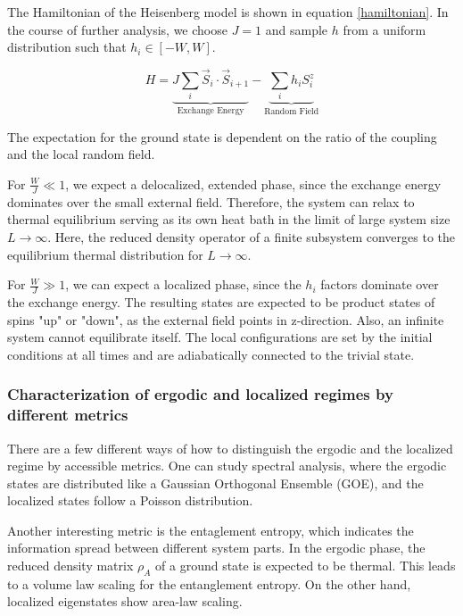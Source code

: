 \documentclass[reprint,amsmath,amssymb,aps,prb]{revtex4-2}
\begin{document}
The Hamiltonian of the Heisenberg model is shown in equation \ref{hamiltonian}. In the course of further analysis, we choose $J=1$ and sample $h$ from a uniform distribution such that $h_i \in \left[-W, W\right]$.

\begin{equation}
	H=\underbrace{J\sum_i \vec{S}_i\cdot\vec{S}_{i+1}}_{\text{Exchange Energy}}-\underbrace{\sum_ih_iS_i^z}_{\text{Random Field}}\label{hamiltonian}
\end{equation}

The expectation for the ground state is dependent on the ratio of the coupling and the local random field. 

For $\frac{W}{J} \ll 1$, we expect a delocalized, extended phase, since the exchange energy dominates over the small external field. Therefore, the system can relax to thermal equilibrium serving as its own heat bath in the limit of large system size $L\rightarrow\infty$.
Here, the reduced density operator of a finite subsystem converges to the equilibrium thermal distribution
for $L\rightarrow\infty$.\cite{Pal2010}

For $\frac{W}{J} \gg 1$, we can expect a localized phase, since the $h_i$ factors dominate over the exchange energy. The resulting states are expected to be product states of spins "up" or "down", as the external field points in z-direction. Also, an infinite system cannot equilibrate itself. The local configurations are set by the initial conditions at all times and are adiabatically connected to the trivial state.\cite{Pal2010}

\subsubsection{Characterization of ergodic and localized regimes by different metrics}

There are a few different ways of how to distinguish the ergodic and the localized regime by accessible metrics. 
One can study spectral analysis, where the ergodic states are distributed like a Gaussian Orthogonal Ensemble (GOE), and the localized states follow a Poisson distribution.\cite{Laumann2014}

Another interesting metric is the entaglement entropy, which indicates the information spread between different system parts\cite{Nandkishore_2015}. In the ergodic phase, the reduced density matrix $\rho_A$ of a ground state is expected to be thermal. This leads to a volume law scaling for the entanglement entropy\cite{Altman_2015}.	On the other hand, localized eigenstates show area-law scaling\cite{yu2019bulk}.
\end{document}
